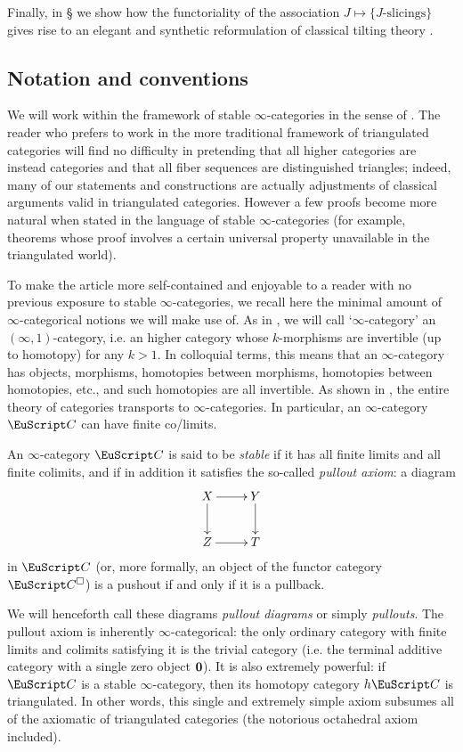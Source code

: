 Finally, in § we show how the functoriality of the association $J\mapsto \{\text{$J$-slicings}\}$ gives rise to an elegant and synthetic reformulation of classical tilting theory \cite{happel}.
{\color{green!40!black}
\subsection{Notation and conventions}
We will work within the framework of stable $\infty$-categories in the sense of \cite{LurieHA}. The reader who prefers to work in the more traditional framework of triangulated categories will find no difficulty in pretending that all higher categories are instead categories and that all fiber sequences are distinguished triangles; indeed, many of our statements and constructions are actually adjustments of classical arguments valid in triangulated categories. However a few proofs become more natural when stated in the language of stable $\infty$-categories (for example, theorems whose proof involves a certain universal property unavailable in the triangulated world).

To make the article more self\hyp{}contained and enjoyable to a reader with no previous exposure to stable $\infty$-categories, we recall here the minimal amount of $\infty$-categorical notions we will make use of. As in \cite{HTT}, we will call `$\infty$-category' an $(\infty,1)$-category, i.e. an higher category whose $k$-morphisms are invertible (up to homotopy) for any $k>1$. In colloquial terms, this means that an $\infty$-category has objects, morphisms, homotopies between morphisms, homotopies between homotopies, etc., and such homotopies are all invertible. As shown in \cite{HTT, Joyal2008}, the entire theory of categories transports to $\infty$-categories. In particular, an $\infty$-category $\C$ can have finite co/limits.
\begin{definition*}
An $\infty$-category $\C$ is said to be \emph{stable}  if it has all finite limits and all finite colimits, and if in addition it satisfies the so-called \emph{pullout axiom}: a diagram
\[
\xymatrix{X\ar[r]\ar[d]&Y\ar[d]\\
Z\ar[r]&T
}
\]
in $\C$ (or, more formally, an object of the functor category $\C^\square$) is a pushout if and only if it is a pullback. 
\end{definition*}
We will henceforth call these diagrams \emph{pullout diagrams} or simply \emph{pullouts}.
The pullout axiom is inherently $\infty$-categorical: the only ordinary category with finite limits and colimits satisfying it is the trivial category (i.e. the terminal additive category with a single zero object $\bf 0$). It is also extremely powerful: if $\C$ is a stable $\infty$-category, then its homotopy category $h\C$ is triangulated. In other words, this single and extremely simple axiom subsumes all of the axiomatic of triangulated categories (the notorious octahedral axiom included). 

}
